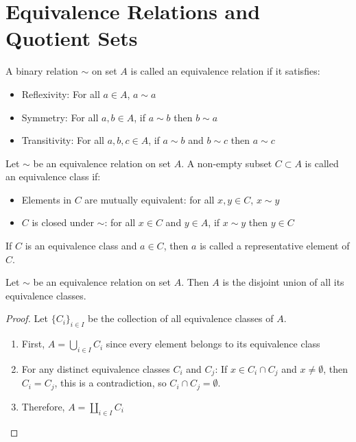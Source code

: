 \section{Equivalence Relations and Quotient Sets}

\begin{definition}
  A binary relation $\sim$ on set $A$ is called an equivalence relation if it satisfies:
  \begin{itemize}
    \item Reflexivity: For all $a \in A$, $a \sim a$
    \item Symmetry: For all $a,b \in A$, if $a \sim b$ then $b \sim a$
    \item Transitivity: For all $a,b,c \in A$, if $a \sim b$ and $b \sim c$ then $a \sim c$
  \end{itemize}
\end{definition}

\begin{definition}
  Let $\sim$ be an equivalence relation on set $A$. A non-empty subset $C \subset A$ is called an equivalence class if:
  \begin{itemize}
    \item Elements in $C$ are mutually equivalent: for all $x,y \in C$, $x \sim y$
    \item $C$ is closed under $\sim$: for all $x \in C$ and $y \in A$, if $x \sim y$ then $y \in C$
  \end{itemize}
  If $C$ is an equivalence class and $a \in C$, then $a$ is called a representative element of $C$.
\end{definition}

\begin{proposition}
  Let $\sim$ be an equivalence relation on set $A$. Then $A$ is the disjoint union of all its equivalence classes.
\end{proposition}

\begin{proof}
  Let $\{C_i\}_{i \in I}$ be the collection of all equivalence classes of $A$.
  \begin{enumerate}
    \item First, $A = \bigcup_{i \in I} C_i$ since every element belongs to its equivalence class
    \item For any distinct equivalence classes $C_i$ and $C_j$:
      If $x \in C_i \cap C_j$ and $x\neq \emptyset $, then $C_i = C_j$, this is a contradiction, so $C_i \cap C_j = \emptyset$.
    \item Therefore, $A = \coprod_{i \in I} C_i$
  \end{enumerate}
\end{proof}


